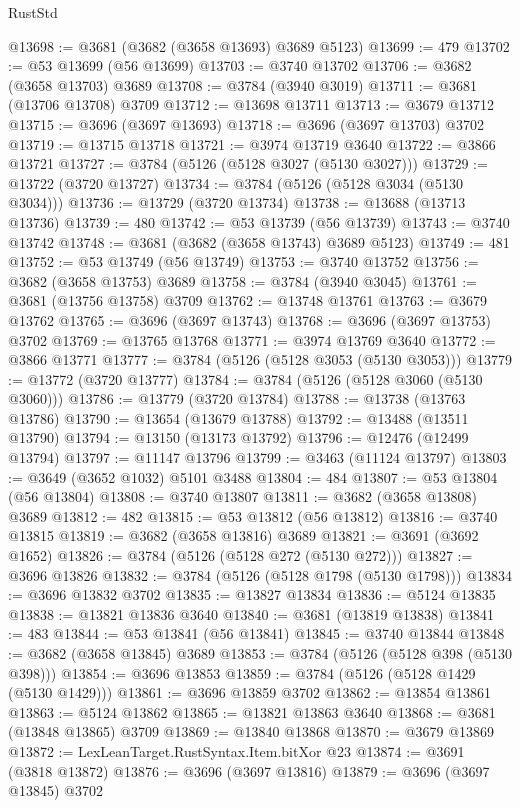 \begin{lexlean}{RustStd}
\begin{coremodule}
@13698 := @3681 (@3682 (@3658 @13693) @3689 @5123)
@13699 := 479
@13702 := @53 @13699 (@56 @13699)
@13703 := @3740 @13702
@13706 := @3682 (@3658 @13703) @3689
@13708 := @3784 (@3940 @3019)
@13711 := @3681 (@13706 @13708) @3709
@13712 := @13698 @13711
@13713 := @3679 @13712
@13715 := @3696 (@3697 @13693)
@13718 := @3696 (@3697 @13703) @3702
@13719 := @13715 @13718
@13721 := @3974 @13719 @3640
@13722 := @3866 @13721
@13727 := @3784 (@5126 (@5128 @3027 (@5130 @3027)))
@13729 := @13722 (@3720 @13727)
@13734 := @3784 (@5126 (@5128 @3034 (@5130 @3034)))
@13736 := @13729 (@3720 @13734)
@13738 := @13688 (@13713 @13736)
@13739 := 480
@13742 := @53 @13739 (@56 @13739)
@13743 := @3740 @13742
@13748 := @3681 (@3682 (@3658 @13743) @3689 @5123)
@13749 := 481
@13752 := @53 @13749 (@56 @13749)
@13753 := @3740 @13752
@13756 := @3682 (@3658 @13753) @3689
@13758 := @3784 (@3940 @3045)
@13761 := @3681 (@13756 @13758) @3709
@13762 := @13748 @13761
@13763 := @3679 @13762
@13765 := @3696 (@3697 @13743)
@13768 := @3696 (@3697 @13753) @3702
@13769 := @13765 @13768
@13771 := @3974 @13769 @3640
@13772 := @3866 @13771
@13777 := @3784 (@5126 (@5128 @3053 (@5130 @3053)))
@13779 := @13772 (@3720 @13777)
@13784 := @3784 (@5126 (@5128 @3060 (@5130 @3060)))
@13786 := @13779 (@3720 @13784)
@13788 := @13738 (@13763 @13786)
@13790 := @13654 (@13679 @13788)
@13792 := @13488 (@13511 @13790)
@13794 := @13150 (@13173 @13792)
@13796 := @12476 (@12499 @13794)
@13797 := @11147 @13796
@13799 := @3463 (@11124 @13797)
@13803 := @3649 (@3652 @1032) @5101 @3488
@13804 := 484
@13807 := @53 @13804 (@56 @13804)
@13808 := @3740 @13807
@13811 := @3682 (@3658 @13808) @3689
@13812 := 482
@13815 := @53 @13812 (@56 @13812)
@13816 := @3740 @13815
@13819 := @3682 (@3658 @13816) @3689
@13821 := @3691 (@3692 @1652)
@13826 := @3784 (@5126 (@5128 @272 (@5130 @272)))
@13827 := @3696 @13826
@13832 := @3784 (@5126 (@5128 @1798 (@5130 @1798)))
@13834 := @3696 @13832 @3702
@13835 := @13827 @13834
@13836 := @5124 @13835
@13838 := @13821 @13836 @3640
@13840 := @3681 (@13819 @13838)
@13841 := 483
@13844 := @53 @13841 (@56 @13841)
@13845 := @3740 @13844
@13848 := @3682 (@3658 @13845) @3689
@13853 := @3784 (@5126 (@5128 @398 (@5130 @398)))
@13854 := @3696 @13853
@13859 := @3784 (@5126 (@5128 @1429 (@5130 @1429)))
@13861 := @3696 @13859 @3702
@13862 := @13854 @13861
@13863 := @5124 @13862
@13865 := @13821 @13863 @3640
@13868 := @3681 (@13848 @13865) @3709
@13869 := @13840 @13868
@13870 := @3679 @13869
@13872 := LexLeanTarget.RustSyntax.Item.bitXor @23
@13874 := @3691 (@3818 @13872)
@13876 := @3696 (@3697 @13816)
@13879 := @3696 (@3697 @13845) @3702

\end{coremodule}
\end{lexlean}
